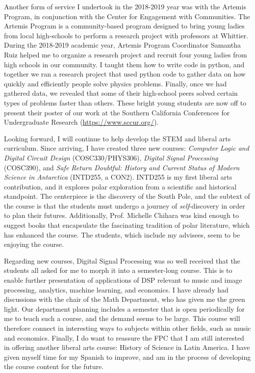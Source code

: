 \documentclass[../../main.tex]{subfiles}
\begin{document}
Another form of service I undertook in the 2018-2019 year was with the Artemis Program, in conjunction with the Center for Engagement with Communities.  The Artemis Program is a community-based program designed to bring young ladies from local high-schools to perform a research project with professors at Whittier.  During the 2018-2019 academic year, Artemis Program Coordinator Samantha Ruiz helped me to organize a research project and recruit four young ladies from high schools in our community.  I taught them how to write code in python, and together we ran a research project that used python code to gather data on how quickly and efficiently people solve physics problems.  Finally, once we had gathered data, we revealed that some of their high-school peers solved certain types of problems faster than others.  These bright young students are now off to present their poster of our work at the Southern California Conferences for Undergraduate Research (\url{https://www.sccur.org/}). \\ \hspace{0.1cm}

Looking forward, I will continue to help develop the STEM and liberal arts curriculum.  Since arriving, I have created three new courses: \textit{Computer Logic and Digital Circuit Design} (COSC330/PHYS306), \textit{Digital Signal Processing} (COSC390), and \textit{Safe Return Doubtful: History and Current Status of Modern Science in Antarctica} (INTD255, a CON2).  INTD255 is my first liberal arts contribution, and it explores polar exploration from a scientific and historical standpoint.  The centerpiece is the discovery of the South Pole, and the subtext of the course is that the students must undergo a journey of \textit{self}-discovery in order to plan their futures.  Additionally, Prof. Michelle Chihara was kind enough to suggest books that encapsulate the fascinating tradition of polar literature, which has enhanced the course.  The students, which include my advisees, seem to be enjoying the course.  \\ \hspace{0.1cm}

Regarding new courses, Digital Signal Processing was so well received that the students all asked for me to morph it into a semester-long course.  This is to enable further presentation of applications of DSP relevant to music and image processing, analytics, machine learning, and economics.  I have already had discussions with the chair of the Math Department, who has given me the green light.  Our department planning includes a semester that is open periodically for me to teach such a course, and the demand seems to be large.  This course will therefore connect in interesting ways to subjects within other fields, such as music and economics.  Finally, I do want to reassure the FPC that I am still interested in offering another liberal arts course: History of Science in Latin America.  I have given myself time for my Spanish to improve, and am in the process of developing the course content for the future. \\ \hspace{0.1cm}
\end{document}
